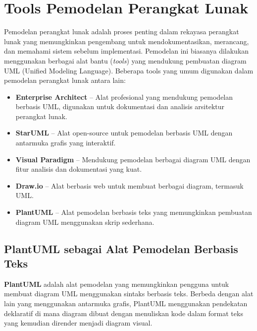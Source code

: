 \section{Tools Pemodelan Perangkat Lunak}

Pemodelan perangkat lunak adalah proses penting dalam rekayasa perangkat lunak yang memungkinkan pengembang untuk mendokumentasikan, merancang, dan memahami sistem sebelum implementasi. Pemodelan ini biasanya dilakukan menggunakan berbagai alat bantu (\textit{tools}) yang mendukung pembuatan diagram UML (Unified Modeling Language). Beberapa tools yang umum digunakan dalam pemodelan perangkat lunak antara lain:

\begin{itemize}
	\item \textbf{Enterprise Architect} – Alat profesional yang mendukung pemodelan berbasis UML, digunakan untuk dokumentasi dan analisis arsitektur perangkat lunak.
	\item \textbf{StarUML} – Alat open-source untuk pemodelan berbasis UML dengan antarmuka grafis yang interaktif.
	\item \textbf{Visual Paradigm} – Mendukung pemodelan berbagai diagram UML dengan fitur analisis dan dokumentasi yang kuat.
	\item \textbf{Draw.io} – Alat berbasis web untuk membuat berbagai diagram, termasuk UML.
	\item \textbf{PlantUML} – Alat pemodelan berbasis teks yang memungkinkan pembuatan diagram UML menggunakan skrip sederhana.
\end{itemize}

\subsection{PlantUML sebagai Alat Pemodelan Berbasis Teks}

\textbf{PlantUML} adalah alat pemodelan yang memungkinkan pengguna untuk membuat diagram UML menggunakan sintaks berbasis teks. Berbeda dengan alat lain yang menggunakan antarmuka grafis, PlantUML menggunakan pendekatan deklaratif di mana diagram dibuat dengan menuliskan kode dalam format teks yang kemudian dirender menjadi diagram visual.

